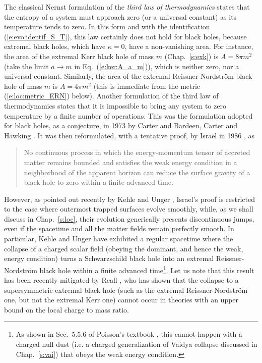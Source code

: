 The classical Nernst formulation of the \emph{third law of thermodynamics}
states that the entropy of a system must approach zero (or a universal constant)
as its temperature tends to zero. In this form and with the identification (\ref{e:evo:identif_S_T}), this law certainly does not hold for black holes, because
extremal black holes, which have $\kappa=0$, have a non-vanishing area. For
instance, the area of the extremal Kerr black hole of mass $m$ (Chap.~\ref{s:exk}) is
$A = 8\pi m^2$ (take the limit $a\to m$ in Eq.~(\ref{e:ker:A_a_m})),
which is neither zero, nor a universal constant. Similarly, the area of
the extremal Reissner-Nordström black hole of mass $m$ is $A = 4\pi m^2$
(this is immediate from the metric (\ref{e:loc:metric_ERN}) below).
Another formulation of the third law of thermodynamics states that it is impossible to bring any
system to zero temperature by a finite number of operations. This was the formulation adopted
for black holes, as a conjecture, in 1973 by Carter \cite{Carte73b} and Bardeen, Carter and Hawking \cite{BardeCH73}.
It was then reformulated, with a tentative proof, by Israel in 1986 \cite{Israe86b}, as
\begin{quote}
No continuous process in which the energy-momentum tensor of accreted matter remains
bounded and satisfies the weak energy
condition in a neighborhood of the apparent
horizon can reduce the surface gravity of a black hole to zero
within a finite advanced time.
\end{quote}
However, as pointed out recently by Kehle and Unger \cite{KehleU23}, Israel's proof
is restricted to the case where outermost trapped surfaces evolve smoothly, while, as we shall discuss in Chap.~\ref{s:loc},
their evolution generically presents discontinuous jumps, even if the spacetime
and all the matter fields remain perfectly smooth. In particular, Kehle and Unger \cite{KehleU23} have exhibited a regular spacetime where the collapse of a charged scalar field (obeying the dominant, and hence the weak, energy condition) turns a Schwarzschild black hole
into an extremal Reissner-Nordström black hole within a finite advanced time\footnote{As shown
in Sec.~5.5.6 of Poisson's textbook \cite{Poiss04}, this cannot happen with a charged null dust
(i.e. a charged generalization of Vaidya collapse discussed in Chap.~\ref{s:vai}) that obeys
the weak energy condition.}. Let us note that this result has been recently mitigated
by Reall \cite{Reall24}, who has shown that the collapse
to a supersymmetric extremal black hole (such as the extremal Reissner-Nordström one, but
not the extremal Kerr one)
cannot occur in theories with an upper bound on the local charge to mass ratio.

